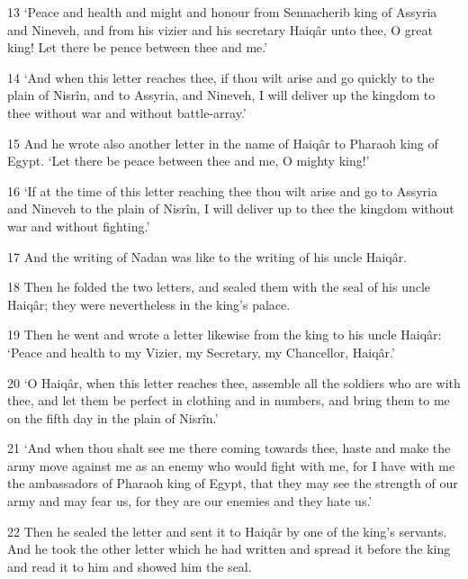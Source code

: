 \par 13 ‘Peace and health and might and honour from Sennacherib king of Assyria and Nineveh, and from his vizier and his secretary Haiqâr unto thee, O great king! Let there be pence between thee and me.’

\par 14 ‘And when this letter reaches thee, if thou wilt arise and go quickly to the plain of Nisrîn, and to Assyria, and Nineveh, I will deliver up the kingdom to thee without war and without battle-array.’

\par 15 And he wrote also another letter in the name of Haiqâr to Pharaoh king of Egypt. ‘Let there be peace between thee and me, O mighty king!’

\par 16 ‘If at the time of this letter reaching thee thou wilt arise and go to Assyria and Nineveh to the plain of Nisrîn, I will deliver up to thee the kingdom without war and without fighting.’

\par 17 And the writing of Nadan was like to the writing of his uncle Haiqâr.

\par 18 Then he folded the two letters, and sealed them with the seal of his uncle Haiqâr; they were nevertheless in the king's palace.

\par 19 Then he went and wrote a letter likewise from the king to his uncle Haiqâr: ‘Peace and health to my Vizier, my Secretary, my Chancellor, Haiqâr.’

\par 20 ‘O Haiqâr, when this letter reaches thee, assemble all the soldiers who are with thee, and let them be perfect in clothing and in numbers, and bring them to me on the fifth day in the plain of Nisrîn.’

\par 21 ‘And when thou shalt see me there coming towards thee, haste and make the army move against me as an enemy who would fight with me, for I have with me the ambassadors of Pharaoh king of Egypt, that they may see the strength of our army and may fear us, for they are our enemies and they hate us.’

\par 22 Then he sealed the letter and sent it to Haiqâr by one of the king's servants. And he took the other letter which he had written and spread it before the king and read it to him and showed him the seal.

